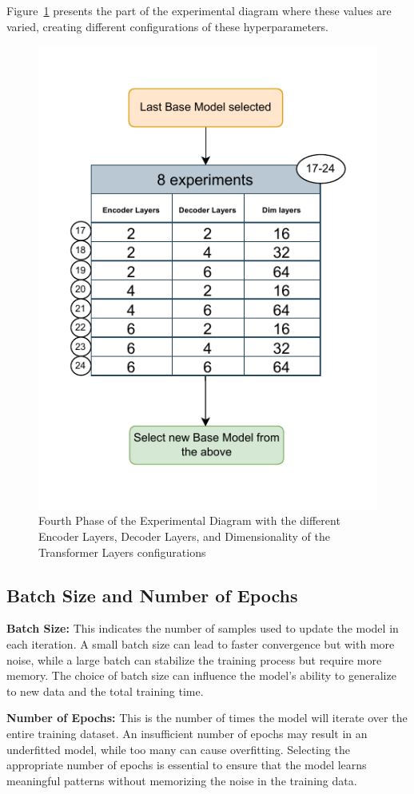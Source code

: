 Figure~\ref{D4} presents the part of the experimental diagram where these values are varied, creating different configurations of these hyperparameters.

\begin{figure}[htbp]
    \centering
    \includegraphics[width=8 cm]{5_ChapterDesign/figuras/Diagrams/D4.pdf}
    \caption{Fourth Phase of the Experimental Diagram with the different Encoder Layers, Decoder Layers, and Dimensionality of the Transformer Layers configurations}
    \label{D4}
\end{figure}


\subsection{Batch Size and Number of Epochs}

\textbf{Batch Size:} This indicates the number of samples used to update the model in each iteration. A small batch size can lead to faster convergence but with more noise, while a large batch can stabilize the training process but require more memory. The choice of batch size can influence the model's ability to generalize to new data and the total training time.

\vspace{10pt}

\noindent\textbf{Number of Epochs:} This is the number of times the model will iterate over the entire training dataset. An insufficient number of epochs may result in an underfitted model, while too many can cause overfitting. Selecting the appropriate number of epochs is essential to ensure that the model learns meaningful patterns without memorizing the noise in the training data.

